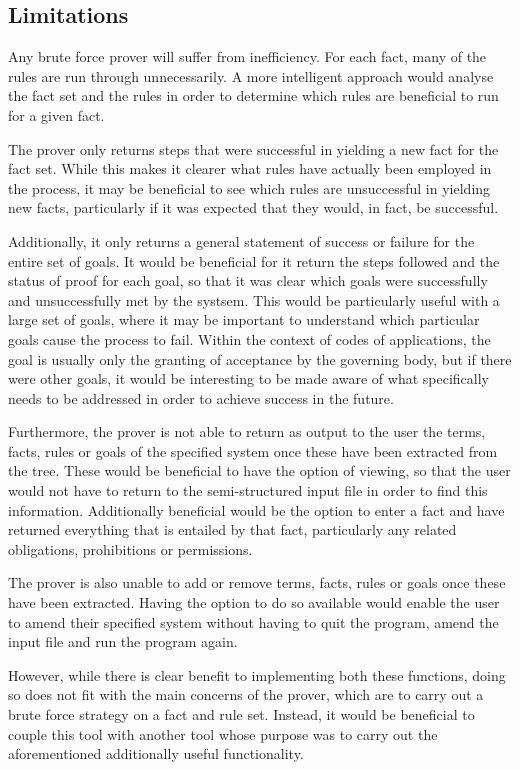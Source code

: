 \documentclass{l4proj}
\begin{document}
\subsection{Limitations}
Any brute force prover will suffer from inefficiency. For each fact, many of the rules are run through unnecessarily. A more intelligent approach would analyse the fact set and the rules in order to determine which rules are beneficial to run for a given fact. 

The prover only returns steps that were successful in yielding a new fact for the fact set. While this makes it clearer what rules have actually been employed in the process, it may be beneficial to see which rules are unsuccessful in yielding new facts, particularly if it was expected that they would, in fact, be successful. 

Additionally, it only returns a general statement of success or failure for the entire set of goals. It would be beneficial for it return the steps followed and the status of proof for each goal, so that it was clear which goals were successfully and unsuccessfully met by the systsem. This would be particularly useful with a large set of goals, where it may be important to understand which particular goals cause the process to fail. Within the context of codes of applications, the goal is usually only the granting of acceptance by the governing body, but if there were other goals, it would be interesting to be made aware of what specifically needs to be addressed in order to achieve success in the future. 

Furthermore, the prover is not able to return as output to the user the terms, facts, rules or goals of the specified system once these have been extracted from the tree. These would be beneficial to have the option of viewing, so that the user would not have to return to the semi-structured input file in order to find this information. Additionally beneficial would be the option to enter a fact and have returned everything that is entailed by that fact, particularly any related obligations, prohibitions or permissions. 

The prover is also unable to add or remove terms, facts, rules or goals once these have been extracted. Having the option to do so available would enable the user to amend their specified system without having to quit the program, amend the input file and run the program again. 

However, while there is clear benefit to implementing both these functions, doing so does not fit with the main concerns of the prover, which are to carry out a brute force strategy on a fact and rule set. Instead, it would be beneficial to couple this tool with another tool whose purpose was to carry out the aforementioned additionally useful functionality. 
\end{document}
